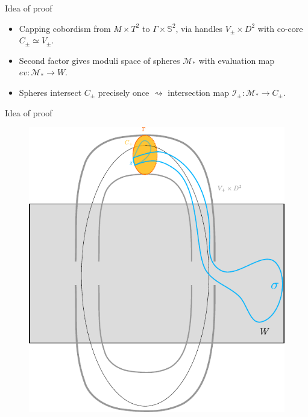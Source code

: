 \documentclass{beamer}
\begin{document}
\begin{frame}{Idea of proof}
    \begin{itemize}
    \item Capping cobordism from $M\times T^2$ to $\Gamma\times \mathbb S^2$, via handles $V_\pm \times D^2$ with co-core $C_\pm \simeq V_\pm$. 
    \item Second factor gives moduli space of spheres $\mathcal M_*$ with evaluation map $ev: \mathcal M_*\rightarrow W$. 
    \item Spheres intersect $C_\pm$ precisely once $\rightsquigarrow$ intersection map $\mathcal I_\pm:\mathcal M_*\rightarrow C_\pm$.
    \end{itemize}
\end{frame}

\begin{frame}{Idea of proof}
    \begin{figure}
        \centering
        \includegraphics[trim=0cm 2.5cm 0cm 0cm, clip]{../images/obstruction_proof_sketch.pdf}
    \end{figure}
\end{frame}
\end{document}

